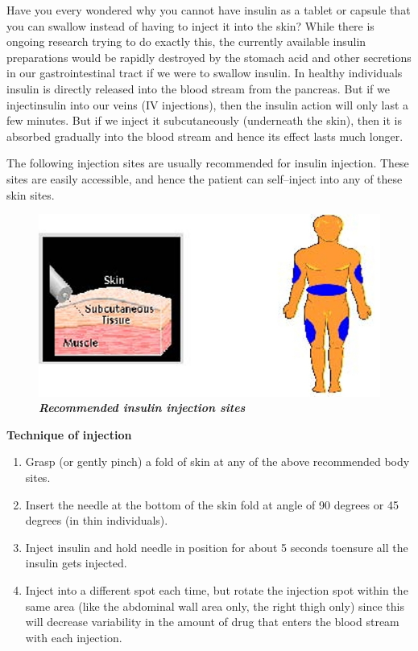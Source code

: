 Have you every wondered why you cannot have insulin as a tablet or capsule that you can swallow instead of having to inject it into the skin? While there is ongoing research trying to do exactly this, the currently available insulin preparations would be rapidly destroyed by the stomach acid and other secretions in our gastrointestinal tract if we were to swallow insulin. In healthy individuals insulin is directly released into the blood stream from the pancreas. But if we inject\break insulin into our veins (IV injections), then the insulin action will only last a few minutes. But if we inject it subcutaneously (underneath the skin), then it is absorbed gradually into the blood stream and hence its effect lasts much longer.

The following injection sites are usually recommended for insulin injection. These sites are easily accessible, and hence the patient can self–inject into any of these skin sites.

\begin{figure}[h]
\centering
\includegraphics[scale=1.6]{images/089.jpg}\\
\textbf{\textit{Recommended insulin injection sites}}
\end{figure}

\noindent\textbf{Technique of injection}

\begin{enumerate}[•]
\itemsep=0pt
\item Grasp (or gently pinch) a fold of skin at any of the above reco\-mmended body sites.
\item Insert the needle at the bottom of the skin fold at angle of 90 degrees or 45 degrees (in thin individuals).
\item Inject insulin and hold needle in position for about 5 seconds to\break ensure all the insulin gets injected.
\item Inject into a different spot each time, but rotate the injection spot within the same area (like the abdominal wall area only, the right thigh only) since this will decrease variability in the amount of drug that enters the blood stream with each injection.
\end{enumerate}

